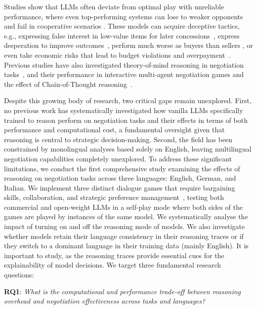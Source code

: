 \documentclass[11pt]{article}
\begin{document}
Studies show that LLMs often deviate from optimal play with unreliable performance, where even top-performing systems can lose to weaker opponents and fail in cooperative scenarios \cite{DBLP:conf/iclr/DavidsonVK024,DBLP:journals/corr/abs-2411-05990,DBLP:conf/icml/0001CYTJ024,DBLP:conf/emnlp/KwonWKCLG24}. These models can acquire deceptive tactics, e.g., expressing false interest in low-value items for later concessions~\cite{lewis-etal-2017-deal}, express desperation to improve outcomes~\cite{DBLP:conf/icml/0001CYTJ024}, perform much worse as buyers than sellers \cite{DBLP:conf/acl/Xia0RMZ0024}, or even take economic risks that lead to budget violations and overpayment~\cite{DBLP:journals/corr/abs-2506-00073}. Previous studies have also investigated theory-of-mind reasoning in negotiation tasks~\cite{DBLP:conf/emnlp/KwonWKCLG24}, and their performance in interactive multi-agent negotiation games and the effect of Chain-of-Thought reasoning~\cite{ DBLP:conf/emnlp/ChanJYDF0L0WS24, abdelnabi2024llmdeliberation}.

Despite this growing body of research, two critical gaps remain unexplored. First, no previous work has systematically investigated how vanilla LLMs specifically trained to reason perform on negotiation tasks and their effects in terms of both performance and computational cost, a fundamental oversight given that reasoning is central to strategic decision-making. Second, the field has been constrained by monolingual analyses based solely on English, leaving multilingual negotiation capabilities completely unexplored. To address these significant limitations, we conduct the first comprehensive study examining the effects of reasoning on negotiation tasks across three languages: English, German, and Italian. We implement three distinct dialogue games that require bargaining skills, collaboration, and strategic preference management~\cite{VonNeumann+Morgenstern:1944,nash1953two,fisher_getting_2011}, testing both commercial and open-weight LLMs in a self-play mode where both sides of the games are played by instances of the same model. We systematically analyse the impact of turning on and off the reasoning mode of models. We also investigate whether models retain their language consistency in their reasoning traces or if they switch to a dominant language in their training data (mainly English). It is important to study, as the reasoning traces provide essential cues for the explainability of model decisions. We target three fundamental research questions:

\noindent\textbf{RQ1}: \textit{What is the computational and performance trade-off between reasoning overhead and negotiation effectiveness across tasks and languages?}
\end{document}
